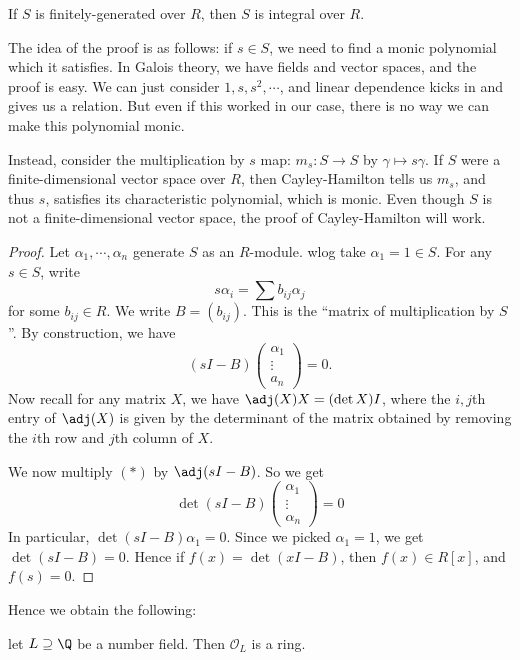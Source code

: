 \documentclass[a4paper]{article}
\begin{document}
\begin{thm}
  If $S$ is finitely-generated over $R$, then $S$ is integral over $R$.
\end{thm}
The idea of the proof is as follows: if $s \in S$, we need to find a monic polynomial which it satisfies. In Galois theory, we have fields and vector spaces, and the proof is easy. We can just consider $1, s, s^2, \cdots$, and linear dependence kicks in and gives us a relation. But even if this worked in our case, there is no way we can make this polynomial monic.

Instead, consider the multiplication by $s$ map: $m_s: S \to S$ by $\gamma \mapsto s\gamma$. If $S$ were a finite-dimensional vector space over $R$, then Cayley-Hamilton tells us $m_s$, and thus $s$, satisfies its characteristic polynomial, which is monic. Even though $S$ is not a finite-dimensional vector space, the proof of Cayley-Hamilton will work.

\begin{proof}
  Let $\alpha_1, \cdots, \alpha_n$ generate $S$ as an $R$-module. wlog take $\alpha_1 = 1 \in S$. For any $s \in S$, write
  \[
    s \alpha_i = \sum b_{ij}\alpha_j
  \]
  for some $b_{ij} \in R$. We write $B = (b_{ij})$. This is the ``matrix of multiplication by $S$''. By construction, we have
  \[
    (sI - B)
    \begin{pmatrix}
      \alpha_1\\\vdots\\a_n
    \end{pmatrix} = 0.\tag{$*$}
  \]
  Now recall for any matrix $X$, we have $\adj(X)X = (\det X) I$, where the $i, j$th entry of $\adj(X)$ is given by the determinant of the matrix obtained by removing the $i$th row and $j$th column of $X$.

  We now multiply $(*)$ by $\adj(s I - B)$. So we get
  \[
    \det(sI - B)
    \begin{pmatrix}
      \alpha_1\\\vdots\\\alpha_n
    \end{pmatrix} = 0
  \]
  In particular, $\det(sI - B) \alpha_1 = 0$. Since we picked $\alpha_1 = 1$, we get $\det(sI - B) = 0$. Hence if $f(x) = \det(xI - B)$, then $f(x) \in R[x]$, and $f(s) = 0$.
\end{proof}

Hence we obtain the following:
\begin{cor}
  let $L \supseteq \Q$ be a number field. Then $\mathcal{O}_L$ is a ring.
\end{cor}
\end{document}
